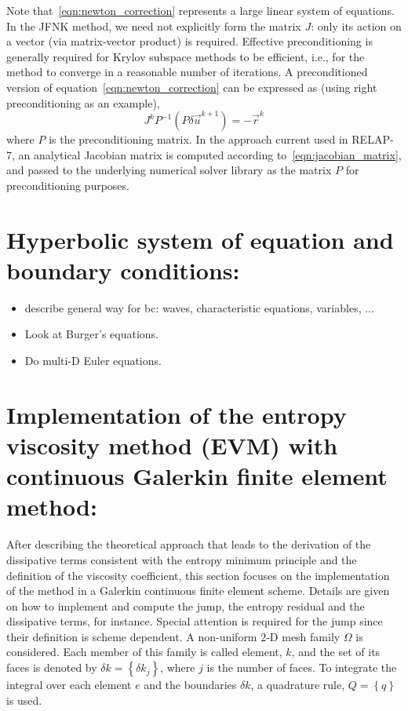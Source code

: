 Note that~\eqref{eqn:newton_correction} represents a large
linear system of equations.  In the JFNK method, we need not
explicitly form the matrix $J$: only its action on a vector
(via matrix-vector product) is required.
Effective preconditioning is generally required for Krylov subspace
methods to be efficient, i.e., for the method to converge in a
reasonable number of iterations. A preconditioned version of
equation~\eqref{eqn:newton_correction} can be expressed as (using
right preconditioning as an example),
\begin{equation}
  \label{eqn:newton_correction_preconditioned}
  J^k P^{-1} \left(P \delta \vec{u}^{k+1} \right)= -\vec{r}^k
\end{equation}
where $P$ is the preconditioning matrix. In the approach current
used in RELAP-7, an analytical Jacobian matrix is computed according
to~\eqref{eqn:jacobian_matrix}, and passed to the underlying numerical solver
library as the matrix $P$ for preconditioning purposes.
\section{Hyperbolic system of equation and boundary conditions:}
\begin{itemize}
\item describe general way for bc: waves, characteristic equations, variables, ...
\item Look at Burger's equations.
\item Do multi-D Euler equations.
\end{itemize}
\section{Implementation of the entropy viscosity method (EVM) with continuous Galerkin finite element method:}
After describing the theoretical approach that leads to the derivation of the dissipative terms consistent with the entropy minimum principle and the definition of the viscosity coefficient, this section focuses on the implementation of the method in a Galerkin continuous finite element scheme. Details are given on how to implement and compute the jump, the entropy residual and the dissipative terms, for instance. Special attention is required for the jump since their definition is scheme dependent. A non-uniform $2$-D mesh family $\Omega$ is considered. Each member of this family is called element, $k$, and the set of its faces is denoted by $\delta k = \left\{ \delta k_j \right\}$, where $j$ is the number of faces. To integrate the integral over each element $e$ and the boundaries $\delta k$, a quadrature rule, $Q = \left\{ q \right\}$ is used.

